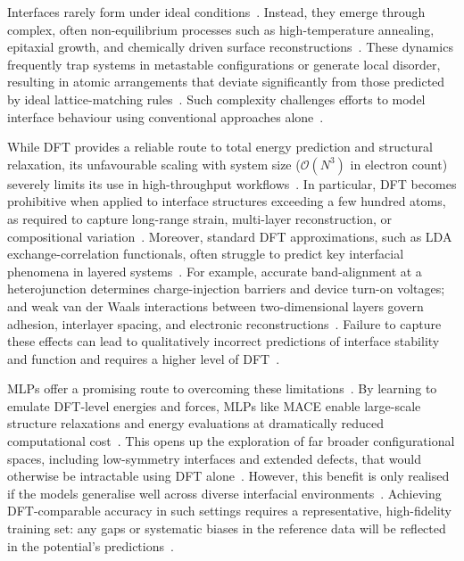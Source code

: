 \label{nonideal_interface_formation} Interfaces rarely form under ideal conditions~\nocite{}.
Instead, they emerge through complex, often non-equilibrium processes such as high-temperature annealing, epitaxial growth, and chemically driven surface reconstructions~\nocite{}.
These dynamics frequently trap systems in metastable configurations or generate local disorder, resulting in atomic arrangements that deviate significantly from those predicted by ideal lattice-matching rules~\nocite{}.
Such complexity challenges efforts to model interface behaviour using conventional approaches alone~\cite{Hepplestone2010-vw, Leung2020-tv, Di_Liberto2022-gz, Gerber2023-yd}.

\label{dft_scaling_limitations} While DFT provides a reliable route to total energy prediction and structural relaxation, its unfavourable scaling with system size ($\mathcal{O}(N^3)$ in electron count) severely limits its use in high-throughput workflows~\nocite{}.
In particular, DFT becomes prohibitive when applied to interface structures exceeding a few hundred atoms, as required to capture long-range strain, multi-layer reconstruction, or compositional variation~\cite{Butler2019-ws, Gerber2023-yd}.
Moreover, standard DFT approximations, such as LDA exchange-correlation functionals, often struggle to predict key interfacial phenomena in layered systems~\nocite{}.
For example, accurate band-alignment at a heterojunction determines charge-injection barriers and device turn-on voltages; and weak van der Waals interactions between two-dimensional layers govern adhesion, interlayer spacing, and electronic reconstructions~\nocite{}.
Failure to capture these effects can lead to qualitatively incorrect predictions of interface stability and function and requires a higher level of DFT~\cite{Gerber2023-yd, Low2025-on}.

\label{mlp_overview} MLPs offer a promising route to overcoming these limitations~\nocite{}.
By learning to emulate DFT-level energies and forces, MLPs like MACE enable large-scale structure relaxations and energy evaluations at dramatically reduced computational cost~\cite{Khot2025-hh, Wang2024-tn}.
This opens up the exploration of far broader configurational spaces, including low-symmetry interfaces and extended defects, that would otherwise be intractable using DFT alone~\nocite{}.
However, this benefit is only realised if the models generalise well across diverse interfacial environments~\nocite{}.
Achieving DFT-comparable accuracy in such settings requires a representative, high-fidelity training set: any gaps or systematic biases in the reference data will be reflected in the potential's predictions~\cite{Schutt2017-ge, Batzner2022-fd, Deng2023-tg}.

